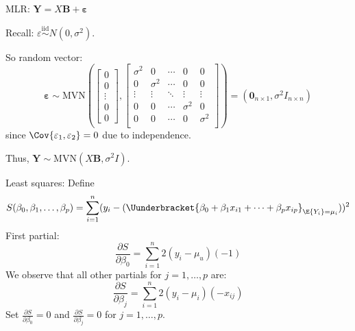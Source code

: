 MLR\@: $ \symbf{Y}=X\symbf{B}+\symbf{\varepsilon} $

Recall: $ \varepsilon\stackrel{\text{iid}}{\sim}N(0,\sigma^2) $.

So random vector:
\[ \symbf{\varepsilon}\sim\text{MVN}
    \left( \begin{bmatrix}
            0      \\
            0      \\
            \vdots \\
            0      \\
            0
        \end{bmatrix},
    \begin{bmatrix}
            \sigma^2 & 0        & \cdots & 0        & 0        \\
            0        & \sigma^2 & \cdots & 0        & 0        \\
            \vdots   & \vdots   & \ddots & \vdots   & \vdots   \\
            0        & 0        & \cdots & \sigma^2 & 0        \\
            0        & 0        & \cdots & 0        & \sigma^2 \\
        \end{bmatrix} \right)=
    (\symbf{0}_{n\times 1},\sigma^2I_{n\times n}) \]
since $ \Cov{\varepsilon_1,\varepsilon_2}=0 $ due to independence.

Thus, $ \symbf{Y}\sim \text{MVN}(X\symbf{B},\sigma^2 I) $.

Least squares: Define
\[ S(\beta_0,\beta_1,\ldots,\beta_p)
    =\sum\limits_{i=1}^{n}
    (y_i-(\Uunderbracket{
        \beta_0+\beta_1 x_{i1}+\cdots+\beta_p x_{ip}
    }_{\E{Y_i}=\mu_i}))^2
\]
First partial:
\[ \frac{\partial S}{\partial \beta_0}=\sum\limits_{i=1}^{n} 2(y_i-\mu_u)(-1)  \]
We observe that all other partials for $ j=1,\ldots,p $ are:
\[ \frac{\partial S}{\partial \beta_j}=
    \sum\limits_{i=1}^{n} 2(y_i-\mu_i)(-x_{ij}) \]
Set $ \displaystyle \frac{\partial S}{\partial \beta_0}=0 $
and $ \displaystyle \frac{\partial S}{\partial \beta_j}=0 $ for $ j=1,\ldots,p $.

